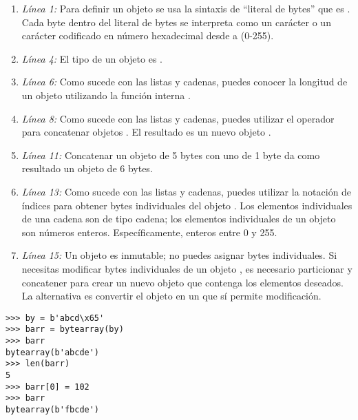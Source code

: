 \begin{enumerate}

\item \emph{Línea 1:} Para definir un objeto  se usa la sintaxis de ``literal de bytes'' que es . Cada byte dentro del literal de bytes se interpreta como un carácter  o un carácter codificado en número hexadecimal desde  a \codigo{\\xFF} (0-255).

\item \emph{Línea 4:} El tipo de un objeto  es .

\item \emph{Línea 6:} Como sucede con las listas y cadenas, puedes conocer la longitud de un objeto  utilizando la función interna .

\item \emph{Línea 8:} Como sucede con las listas y cadenas, puedes utilizar el operador \codigo{+} para concatenar objetos . El resultado es un nuevo objeto .

\item \emph{Línea 11:} Concatenar un objeto  de 5 bytes con uno de 1 byte da como resultado un objeto  de 6 bytes.

\item \emph{Línea 13:} Como sucede con las listas y cadenas, puedes utilizar la notación de índices para obtener bytes individuales del objeto . Los elementos individuales de una cadena son de tipo cadena; los elementos individuales de un objeto  son números enteros. Específicamente, enteros entre 0 y 255.

\item \emph{Línea 15:} Un objeto  es inmutable; no puedes asignar bytes individuales. Si necesitas modificar bytes individuales de un objeto , es necesario particionar y concatener para crear un nuevo objeto  que contenga los elementos deseados. La alternativa es convertir el objeto  en un  que sí permite modificación.

\end{enumerate}

\noindent\begin{minipage}{\textwidth}
\begin{lstlisting}[mathescape=True]
>>> by = b'abcd\x65'
>>> barr = bytearray(by)
>>> barr
bytearray(b'abcde')
>>> len(barr)
5
>>> barr[0] = 102
>>> barr
bytearray(b'fbcde')
\end{lstlisting}
\end{minipage}

